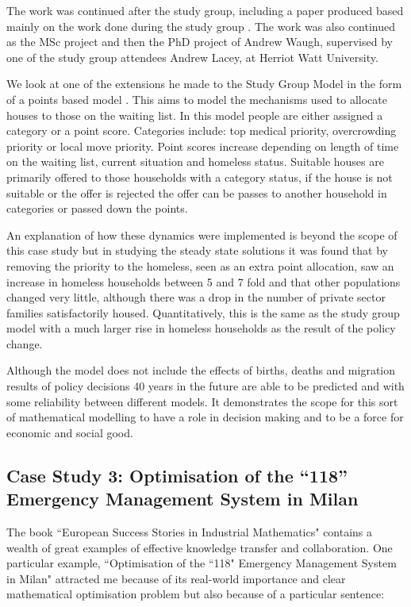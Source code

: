\documentclass[11pt]{article} %
\begin{document}
	The work was continued after the study group, including a paper produced based mainly on the work done during the study group \cite{Byatt-Smith2003}. The work was also continued as the MSc project and then the PhD project of Andrew Waugh, supervised by one of the study group attendees Andrew Lacey, at Herriot Watt University. 
	
	We look at one of the extensions he made to the Study Group Model in the form of a points based model \cite{Waugh1999}. This aims to model the mechanisms used to allocate houses to those on the waiting list.  In this model people are either assigned a category or a point score. Categories include:  top medical priority, overcrowding priority or local move priority.   Point scores increase depending on length of time on the waiting list, current situation and homeless status. Suitable houses are primarily offered to those households with a category status, if the house is not suitable or the offer is rejected the offer can be passes to another household in categories or passed down the points. 
	
	An explanation of how these dynamics were implemented is beyond the scope of this case study but in studying the steady state solutions it was found that by removing the priority to the homeless, seen as an extra point allocation, saw an increase in homeless households between 5 and 7 fold and that other populations changed very little, although there was a drop in the number of private sector families satisfactorily housed. Quantitatively, this is the same as the study group model with a much larger rise in homeless households as the result of the policy change. 
	
	Although the model does not include the effects of births, deaths and migration results of policy decisions 40 years in the future are able to be predicted and with some reliability between different models. It demonstrates the scope for this sort of mathematical modelling to have a role in decision making and to be a force for economic and social good. 
	
	\subsection{Case Study 3: Optimisation of the “118” Emergency Management System in Milan \label{Milan} }
	The book ``European Success Stories in Industrial Mathematics" \cite{European2011} contains a wealth of great examples of effective knowledge transfer and collaboration. One particular example, ``Optimisation of the ``118" Emergency Management System in Milan" attracted me because of its real-world importance and clear mathematical optimisation problem but also because of a particular sentence: 
	
\end{document}
